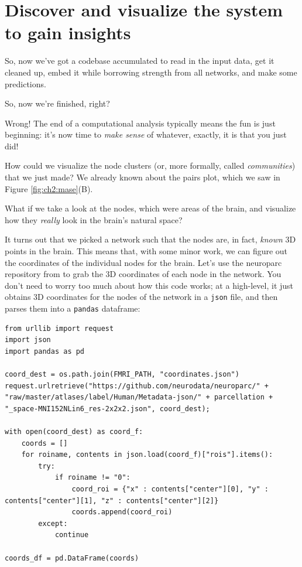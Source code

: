\section{Discover and visualize the system to gain insights}
\label{sec:ch2:discover}

So, now we've got a codebase accumulated to read in the input data, get it cleaned up, embed it while borrowing strength from all networks, and make some predictions. 

So, now we're finished, right?

Wrong! The end of a computational analysis typically means the fun is just beginning: it's now time to \emph{make sense} of whatever, exactly, it is that you just did!

How could we visualize the node clusters (or, more formally, called \emph{communities}) that we just made? We already known about the pairs plot, which we saw in Figure \ref{fig:ch2:mase}(B). 

What if we take a look at the nodes, which were areas of the brain, and visualize how they \emph{really} look in the brain's natural space?

It turns out that we picked a network such that the nodes are, in fact, \emph{known} 3D points in the brain. This means that, with some minor work, we can figure out the coordinates of the individual nodes for the brain. Let's use the neuroparc repository from \cite{Lawrence2021Mar} to grab the 3D coordinates of each node in the network. You don't need to worry too much about how this code works; at a high-level, it just obtains 3D coordinates for the nodes of the network in a \texttt{json} file, and then parses them into a \texttt{pandas} dataframe:


\begin{lstlisting}[style=python]
from urllib import request
import json
import pandas as pd

coord_dest = os.path.join(FMRI_PATH, "coordinates.json")
request.urlretrieve("https://github.com/neurodata/neuroparc/" + "raw/master/atlases/label/Human/Metadata-json/" + parcellation + "_space-MNI152NLin6_res-2x2x2.json", coord_dest);

with open(coord_dest) as coord_f:
    coords = []
    for roiname, contents in json.load(coord_f)["rois"].items():
        try:
            if roiname != "0":
                coord_roi = {"x" : contents["center"][0], "y" : contents["center"][1], "z" : contents["center"][2]}
                coords.append(coord_roi)
        except:
            continue
            
coords_df = pd.DataFrame(coords)
\end{lstlisting}

